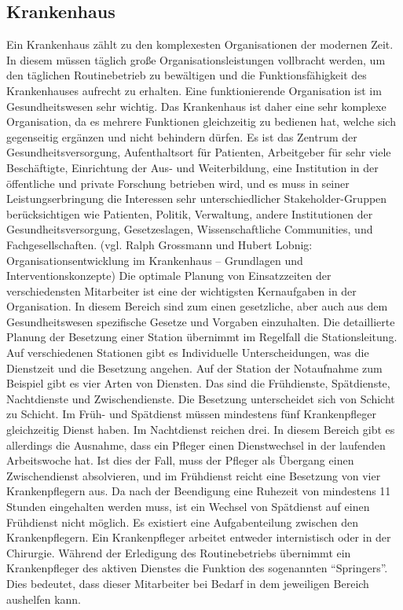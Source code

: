 \documentclass[10pt,a4paper]{article}
\begin{document}
\subsection{Krankenhaus}
Ein Krankenhaus zählt zu den komplexesten Organisationen der modernen Zeit. In diesem müssen täglich große Organisationsleistungen vollbracht werden, um den täglichen Routinebetrieb zu bewältigen und die Funktionsfähigkeit des Krankenhauses aufrecht zu erhalten. Eine funktionierende Organisation ist im Gesundheitswesen sehr wichtig. Das Krankenhaus ist daher eine sehr komplexe Organisation, da es mehrere Funktionen gleichzeitig zu bedienen hat, welche sich gegenseitig ergänzen und nicht behindern dürfen. Es ist das Zentrum der Gesundheitsversorgung, Aufenthaltsort für Patienten, Arbeitgeber für sehr viele Beschäftigte, Einrichtung der Aus- und Weiterbildung,  eine Institution in der öffentliche und private Forschung betrieben wird, und es muss in seiner Leistungserbringung die Interessen sehr unterschiedlicher Stakeholder-Gruppen berücksichtigen wie Patienten, Politik, Verwaltung, andere Institutionen der Gesundheitsversorgung, Gesetzeslagen, Wissenschaftliche Communities, und Fachgesellschaften. (vgl. Ralph Grossmann und Hubert Lobnig: Organisationsentwicklung im Krankenhaus – Grundlagen und Interventionskonzepte) 
Die optimale Planung von Einsatzzeiten der verschiedensten Mitarbeiter ist eine der wichtigsten Kernaufgaben in der Organisation. In diesem Bereich sind zum einen gesetzliche, aber auch aus dem Gesundheitswesen spezifische Gesetze und Vorgaben einzuhalten. Die detaillierte Planung der Besetzung einer Station übernimmt im Regelfall die Stationsleitung. Auf verschiedenen Stationen gibt es Individuelle Unterscheidungen, was die Dienstzeit und die Besetzung angehen. Auf der Station der Notaufnahme zum Beispiel gibt es vier Arten von Diensten. Das sind die Frühdienste, Spätdienste, Nachtdienste und Zwischendienste. Die Besetzung unterscheidet sich von Schicht zu Schicht. Im Früh- und Spätdienst müssen mindestens fünf Krankenpfleger gleichzeitig Dienst haben. Im Nachtdienst reichen drei. In diesem Bereich gibt es allerdings die Ausnahme, dass ein Pfleger einen Dienstwechsel in der laufenden Arbeitswoche hat. Ist dies der Fall, muss der Pfleger als Übergang einen Zwischendienst absolvieren, und im Frühdienst reicht eine Besetzung von vier Krankenpflegern aus. Da nach der Beendigung eine Ruhezeit von mindestens 11 Stunden eingehalten werden muss, ist ein Wechsel von Spätdienst auf einen Frühdienst nicht möglich.
Es existiert eine Aufgabenteilung zwischen den Krankenpflegern. Ein Krankenpfleger arbeitet entweder internistisch oder in der Chirurgie. Während der Erledigung des Routinebetriebs übernimmt ein Krankenpfleger des aktiven Dienstes die Funktion des sogenannten “Springers”. Dies bedeutet, dass dieser Mitarbeiter bei Bedarf in dem jeweiligen Bereich aushelfen kann. 
\end{document}
